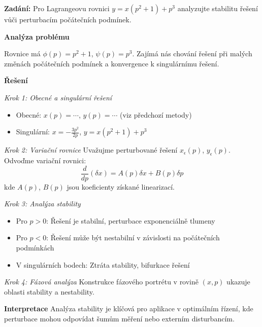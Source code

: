 \begin{example}
\label{ex:stabilita-lagrange}

\noindent\textbf{Zadání:} Pro Lagrangeovu rovnici $y = x(p^2 + 1) + p^3$ analyzujte stabilitu řešení vůči perturbacím počátečních podmínek.

\vspace{1.5\baselineskip}

\noindent\textbf{Analýza problému}

Rovnice má $\phi(p) = p^2 + 1$, $\psi(p) = p^3$. Zajímá nás chování řešení při malých změnách počátečních podmínek a konvergence k singulárnímu řešení.

\vspace{1.5\baselineskip}

\noindent\textbf{Řešení}

\noindent\textit{Krok 1: Obecné a singulární řešení}
\begin{itemize}
\item Obecné: $x(p) = \cdots$, $y(p) = \cdots$ (viz předchozí metody)
\item Singulární: $x = -\frac{3p^2}{2p}$, $y = x(p^2+1) + p^3$
\end{itemize}

\vspace{1\baselineskip}

\noindent\textit{Krok 2: Variační rovnice}
Uvažujme perturbované řešení $x_\epsilon(p)$, $y_\epsilon(p)$. Odvoďme variační rovnici:
\[
\frac{d}{dp}(\delta x) = A(p)\delta x + B(p)\delta p
\]
kde $A(p)$, $B(p)$ jsou koeficienty získané linearizací.

\vspace{1\baselineskip}

\noindent\textit{Krok 3: Analýza stability}
\begin{itemize}
\item Pro $p > 0$: Řešení je stabilní, perturbace exponenciálně tlumeny
\item Pro $p < 0$: Řešení může být nestabilní v závislosti na počátečních podmínkách
\item V singulárních bodech: Ztráta stability, bifurkace řešení
\end{itemize}

\vspace{1\baselineskip}

\noindent\textit{Krok 4: Fázová analýza}
Konstrukce fázového portrétu v rovině $(x, p)$ ukazuje oblasti stability a nestability.

\vspace{1.5\baselineskip}

\noindent\textbf{Interpretace}
Analýza stability je klíčová pro aplikace v optimálním řízení, kde perturbace mohou odpovídat šumům měření nebo externím disturbancím.

\end{example}

